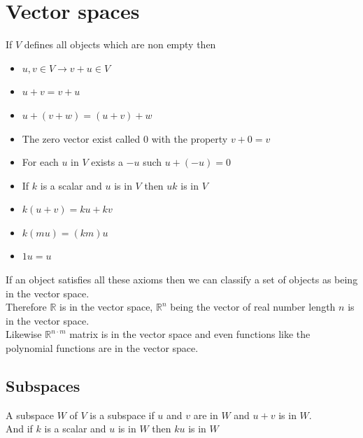 \documentclass[12pt, a4paper]{article}
\begin{document}
	\section{Vector spaces}
		If $V$ defines all objects which are non empty then
		\begin{itemize}
			\item $u,v\in V\rightarrow v+u\in V$
			\item $u+v=v+u$
			\item $u+(v+w)=(u+v)+w$
			\item The zero vector exist called $0$ with the property $v+0=v$
			\item For each $u$ in $V$ exists a $-u$ such $u+(-u)=0$
			\item If $k$ is a scalar and $u$ is in $V$ then $uk$ is in $V$
			\item  $k(u+v)=ku+kv$
			\item $k(mu)=(km)u$
			\item $1u=u$
		\end{itemize}
		If an object satisfies all these axioms then we can classify a set of objects as being in the  vector space.\\
		Therefore $\mathbb{R}$ is in the vector space, $\mathbb{R}^n$ being the vector of real number length $n$ is in the vector space.\\
		Likewise $\mathbb{R}^{n\cdot m}$ matrix is in the vector space and even functions like the polynomial functions are in the vector space.\\
		\subsection{Subspaces}
			A subspace $W$ of $V$ is a subspace if $u$ and $v$ are in $W$ and $u+v$ is in $W$.\\
			And if $k$ is a scalar and $u$ is in $W$ then $ku$ is in $W$\\ 
\end{document}
